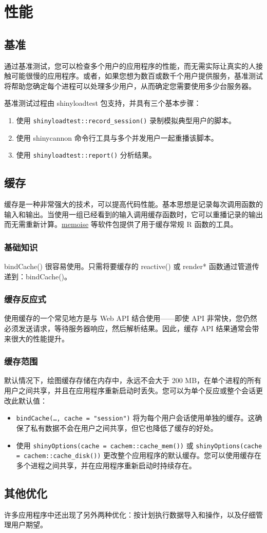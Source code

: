 \chapter{性能}
\section{基准}
通过基准测试，您可以检查多个用户的应用程序的性能，而无需实际让真实的人接触可能很慢的应用程序。或者，如果您想为数百或数千个用户提供服务，基准测试将帮助您确定每个进程可以处理多少用户，从而确定您需要使用多少台服务器。

基准测试过程由 shinyloadtest 包支持，并具有三个基本步骤：
\begin{enumerate}
    \item 使用 \verb|shinyloadtest::record_session()| 录制模拟典型用户的脚本。
    \item 使用 shinycannon 命令行工具与多个并发用户一起重播该脚本。
    \item 使用 \verb|shinyloadtest::report()| 分析结果。
\end{enumerate}
\section{缓存}
缓存是一种非常强大的技术，可以提高代码性能。基本思想是记录每次调用函数的输入和输出。当使用一组已经看到的输入调用缓存函数时，它可以重播记录的输出而无需重新计算。\href{https://memoise.r-lib.org/}{memoise} 等软件包提供了用于缓存常规 R 函数的工具。
\subsection{基础知识}
bindCache() 很容易使用。只需将要缓存的 reactive() 或 render* 函数通过管道传递到：bindCache()。

\subsection{缓存反应式}
使用缓存的一个常见地方是与 Web API 结合使用——即使 API 非常快，您仍然必须发送请求，等待服务器响应，然后解析结果。因此，缓存 API 结果通常会带来很大的性能提升。
\subsection{缓存范围}
默认情况下，绘图缓存存储在内存中，永远不会大于 200 MB，在单个进程的所有用户之间共享，并且在应用程序重新启动时丢失。您可以为单个反应或整个会话更改此默认值：
\begin{itemize}
    \item \verb|bindCache(…, cache = "session")| 将为每个用户会话使用单独的缓存。这确保了私有数据不会在用户之间共享，但它也降低了缓存的好处。
    \item 使用 \verb|shinyOptions(cache = cachem::cache_mem())| 或 \verb|shinyOptions(cache = cachem::cache_disk())| 更改整个应用程序的默认缓存。您可以使用缓存在多个进程之间共享，并在应用程序重新启动时持续存在。
\end{itemize}
\section{其他优化}
许多应用程序中还出现了另外两种优化：按计划执行数据导入和操作，以及仔细管理用户期望。